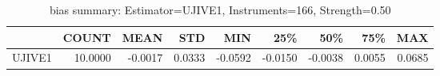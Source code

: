 \begin{table}[ht]
\centering
\caption{bias summary: Estimator=UJIVE1, Instruments=166, Strength=0.50}
\begin{tabular}{lrrrrrrrr}
\toprule
 & COUNT & MEAN & STD & MIN & 25\% & 50\% & 75\% & MAX \\
\midrule
UJIVE1 & 10.0000 & -0.0017 & 0.0333 & -0.0592 & -0.0150 & -0.0038 & 0.0055 & 0.0685 \\
\bottomrule
\end{tabular}
\end{table}
